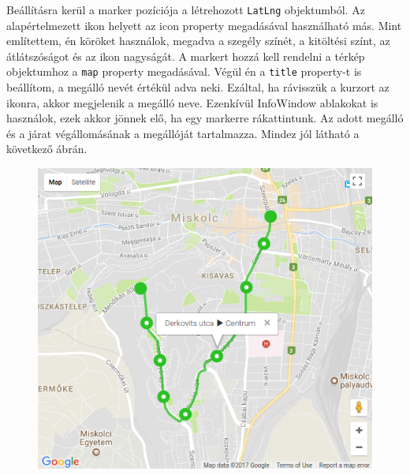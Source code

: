 Beállításra kerül a marker pozíciója a létrehozott \texttt{LatLng} objektumból. Az alapértelmezett ikon helyett az icon property megadásával használható más. Mint említettem, én köröket használok, megadva a szegély színét, a kitöltési színt, az átlátszóságot és az ikon nagyságát. A markert hozzá kell rendelni a térkép objektumhoz a \texttt{map} property megadásával. Végül én a \texttt{title} property-t is beállítom, a megálló nevét értékül adva neki. Ezáltal, ha rávisszük a kurzort az ikonra, akkor megjelenik a megálló neve. Ezenkívül InfoWindow ablakokat is használok, ezek akkor jönnek elő, ha egy markerre rákattintunk. Az adott megálló és a járat végállomásának a megállóját tartalmazza. Mindez jól látható a következő ábrán.

\begin{figure}[htb]
\centering
\includegraphics[scale=0.7]{kepek/terkep.png}
\caption{}
\label{fig:terkep}
\end{figure}
